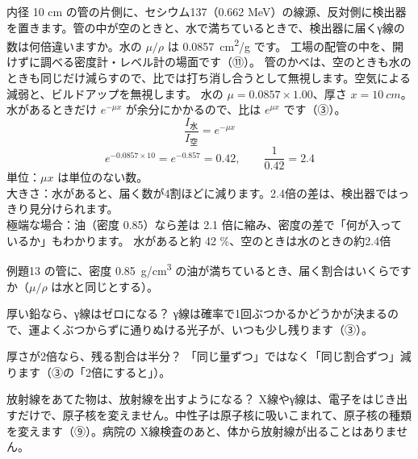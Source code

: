 \label{ph:原-13:ex13}
\begin{phreidai}
内径 10 cm の管の片側に、セシウム137（0.662 MeV）の線源、反対側に検出器を置きます。管の中が空のときと、水で満ちているときで、検出器に届くγ線の数は何倍違いますか。水の $\mu/\rho$ は \qty{0.0857}{cm^2/g} です。
\phbamen
工場の配管の中を、開けずに調べる密度計・レベル計の場面です（⑪）。
\phmushi
管のかべは、空のときも水のときも同じだけ減らすので、比では打ち消し合うとして無視します。空気による減弱と、ビルドアップを無視します。
\phzu
水の $\mu=0.0857\times1.00$、厚さ $x=\qty{10}{cm}$。
\phriyu
水があるときだけ $e^{-\mu x}$ が余分にかかるので、比は $e^{\mu x}$ です（③）。
\phtateru
\[ \frac{I_{\text{水}}}{I_{\text{空}}}=e^{-\mu x} \]
\phtoku
\[ e^{-0.0857\times10}=e^{-0.857}=0.42,\qquad \frac{1}{0.42}=2.4 \]
\phtashikame
単位：$\mu x$ は単位のない数。\\
大きさ：水があると、届く数が4割ほどに減ります。2.4倍の差は、検出器ではっきり見分けられます。\\
極端な場合：油（密度 0.85）なら差は 2.1 倍に縮み、密度の差で「何が入っているか」もわかります。
\kotae 水があると約 42 \%、空のときは水のときの約2.4倍
\end{phreidai}
\begin{jibun}
例題13 の管に、密度 \qty{0.85}{g/cm^3} の油が満ちているとき、届く割合はいくらですか（$\mu/\rho$ は水と同じとする）。
\end{jibun}

\begin{tsumazuki}{厚い鉛なら、γ線はゼロになる？}
γ線は確率で1回ぶつかるかどうかが決まるので、運よくぶつからずに通りぬける光子が、いつも少し残ります（③）。
\end{tsumazuki}

\begin{tsumazuki}{厚さが2倍なら、残る割合は半分？}
「同じ量ずつ」ではなく「同じ割合ずつ」減ります（③の「2倍にすると」）。
\end{tsumazuki}

\begin{tsumazuki}{放射線をあてた物は、放射線を出すようになる？}
X線やγ線は、電子をはじき出すだけで、原子核を変えません。中性子は原子核に吸いこまれて、原子核の種類を変えます（⑨）。病院の X線検査のあと、体から放射線が出ることはありません。
\end{tsumazuki}

